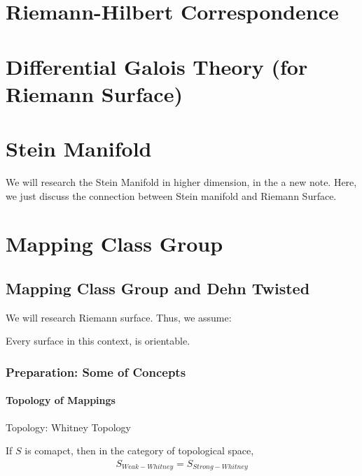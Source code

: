 \documentclass[Total.tex]{subfiles}
\begin{document}
	\chapter{Riemann-Hilbert Correspondence}
	\chapter{Differential Galois Theory (for Riemann Surface)}
	
	\chapter{Stein Manifold}
		We will research the Stein Manifold in higher dimension, in the a new note.  Here, we just discuss the connection between Stein manifold and Riemann Surface. 
	\chapter{Mapping Class Group}
		\section{Mapping Class Group and Dehn Twisted}
			We will research Riemann surface. Thus, we assume:
			\begin{center}
				Every surface in this context, is orientable. 
			\end{center}
			\subsection{Preparation: Some of Concepts}
			
			\subsubsection{Topology of Mappings}
				Topology: Whitney Topology
				
				\begin{proposition}
					If $S$ is comapct, then in the category of topological space,
					\begin{gather*}
						S_{Weak-Whitney}=S_{Strong-Whitney}
					\end{gather*}
				\end{proposition}
\end{document}
